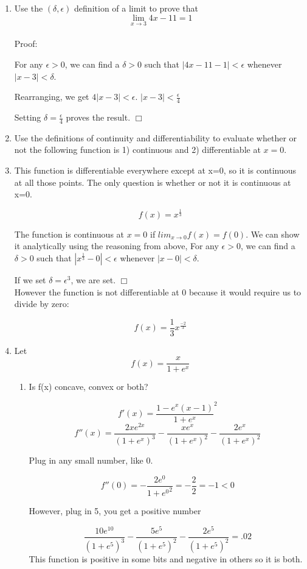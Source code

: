 \documentclass[11pt]{article}
\begin{document}
\begin{enumerate}
\vspace{.2in}
\item Use the $(\delta, \epsilon)$ definition of a limit to prove that 
$$\lim_{x\rightarrow 3} 4x-11=1$$
%
\ \\Proof:  

For any $\epsilon>0$, we can find a $\delta>0$ such that $|4x-11-1|<\epsilon$ whenever $|x-3|<\delta$.  

Rearranging, we get $4|x-3|<\epsilon$.  $| x-3|<\frac{\epsilon}{4}$ 

Setting $\delta=\frac{\epsilon}{4}$ proves the result. $\Box$

\item Use the definitions of continuity and differentiability to evaluate whether or not the following function is 1) continuous and 2) differentiable at $x=0$.

\item[] This function is differentiable everywhere except at x=0,  so it is continuous at all those points.  The only question is whether or not it is continuous at x=0.

$$f(x)=x^{\frac{1}{3}}$$

The function is continuous at $x=0$ if $lim_{x\rightarrow 0} f(x)=f(0)$.   We can show it analytically using the reasoning from above, For any $\epsilon>0$, we can find a $\delta>0$ such that $|x^{\frac{1}{3}}-0|<\epsilon$ whenever $|x-0|<\delta$.  

If we set $\delta=\epsilon^3$, we are set.  $\Box$ \\

However the function is not differentiable at 0 because it would require us to divide by zero:

$$f(x)=\frac{1}{3}x^{\frac{-2}{3}}$$

\vspace{.2in}
\item Let $$f(x)=\frac{x}{1+e^x}$$
\begin{enumerate}
\item Is f(x) concave, convex or both?

$$f'(x)=\frac{1-e^x(x-1)}{1+e^x}^2$$
$$f''(x)=\frac{2xe^{2x}}{{(1+e^x)}^3}-\frac{xe^{x}}{{(1+e^x)}^2}-\frac{2e^{x}}{{(1+e^x)}^2}$$

Plug in any small number, like 0.

$$f''(0)=-\frac{2e^{0}}{{1+e^0}^2}=-\frac{2}{2}=-1<0$$

However, plug in 5, you get a positive number

$$\frac{10e^{10}}{{(1+e^5)}^3}-\frac{5e^{5}}{{(1+e^5)}^2}-\frac{2e^{5}}{{(1+e^5)}^2}=.02$$
This function is positive in some bits and negative in others so it is both.



\end{enumerate}
\end{enumerate}
\end{document}
